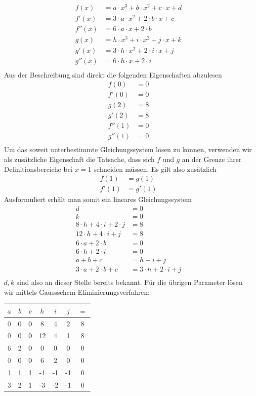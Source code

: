 \begin{align}
f(x) &=a \cdot x^3+b \cdot x^2+c \cdot x+d \\
f'(x) &= 3 \cdot a \cdot x^2+2 \cdot b \cdot x+c \\
f''(x) &= 6 \cdot a \cdot x+2 \cdot b \\
g(x)&=h\cdot x^3+i\cdot x^2+j\cdot x+k \\
g'(x)&=3\cdot h\cdot x^2+2\cdot i\cdot x+j \\	
g''(x)&=6\cdot h\cdot x+2\cdot i \\
\end{align}
Aus der Beschreibung sind direkt die folgenden Eigenschaften abzulesen
\begin{align}
f(0) &= 0 \\
f'(0) &= 0 \\
g(2) &= 8 \\
g'(2) &= 8 \\
f''(1) &= 0 \\
g''(1) &= 0 \\
\end{align}
Um das soweit unterbestimmte Gleichungssystem lösen zu können, verwenden wir als zusätzliche Eigenschaft die Tatsache, dass sich $f$ und $g$ an der Grenze ihrer Definitionsbereiche bei $x=1$ schneiden müssen. Es gilt also zusätzlich
\begin{align}
f(1) &= g(1)\\
f'(1) &= g'(1)
\end{align}
Ausformuliert erhält man somit ein lineares Gleichungssystem
\begin{align}
d &= 0\\
k &= 0\\
8 \cdot h+4 \cdot i+2 \cdot j &= 8 \\
12 \cdot h+4 \cdot i+j &= 8 \\
6 \cdot a+2 \cdot b &= 0 \\
6 \cdot h+2 \cdot i &= 0 \\
a+b+c &= h+i+j \\
3 \cdot a+2 \cdot b+c &= 3 \cdot h+2 \cdot i+j \\
\end{align}
$d,k$ sind also an dieser Stelle bereits bekannt. Für die übrigen Parameter lösen wir mittels Gaussschem Eliminierungsverfahren:
\begin{center}
\begin{tabular}{ccccccc}
$a$&$b$&$c$&$h$&$i$&$j$&$=$\\
\hline
0&0&0&8&4&2&8 \\
0&0&0&12&4&1&8 \\
6&2&0&0&0&0&0 \\
0&0&0&6&2&0&0 \\
1&1&1&-1&-1&-1&0 \\
3&2&1&-3&-2&-1&0
\end{tabular}
\end{center}
